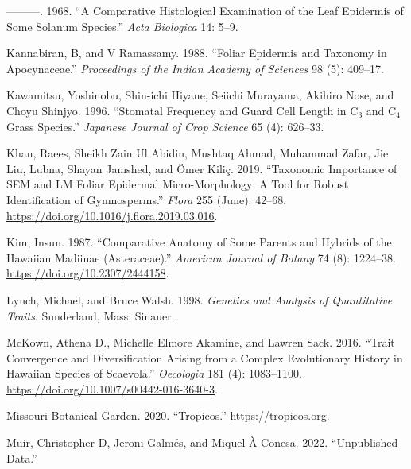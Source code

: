 \documentclass[
  12pt,
]{article}
\newlength{\cslhangindent}
\newlength{\cslentryspacingunit} %
\newenvironment{CSLReferences}[2] %
 {%
  \setlength{\parindent}{0pt}
  \ifodd #1
  \let\oldpar\par
  \def\par{\hangindent=\cslhangindent\oldpar}
  \fi
  \setlength{\parskip}{#2\cslentryspacingunit}
 }%
 {}
\begin{document}
\begin{CSLReferences}{1}{0}
\leavevmode{}%
---------. 1968. {``A Comparative Histological Examination of the Leaf Epidermis of Some {Solanum} Species.''} \emph{Acta Biologica} 14: 5--9.

\leavevmode{}%
Kannabiran, B, and V Ramassamy. 1988. {``Foliar Epidermis and Taxonomy in {Apocynaceae}.''} \emph{Proceedings of the Indian Academy of Sciences} 98 (5): 409--17.

\leavevmode{}%
Kawamitsu, Yoshinobu, Shin-ichi Hiyane, Seiichi Murayama, Akihiro Nose, and Choyu Shinjyo. 1996. {``Stomatal Frequency and Guard Cell Length in {C}\(_{\textrm{3}}\) and {C}\(_{\textrm{4}}\) Grass Species.''} \emph{Japanese Journal of Crop Science} 65 (4): 626--33.

\leavevmode{}%
Khan, Raees, Sheikh Zain Ul Abidin, Mushtaq Ahmad, Muhammad Zafar, Jie Liu, Lubna, Shayan Jamshed, and Ömer Kiliç. 2019. {``Taxonomic Importance of {SEM} and {LM} Foliar Epidermal Micro-Morphology: {A} Tool for Robust Identification of Gymnosperms.''} \emph{Flora} 255 (June): 42--68. \url{https://doi.org/10.1016/j.flora.2019.03.016}.

\leavevmode{}%
Kim, Insun. 1987. {``Comparative {Anatomy} of {Some} {Parents} and {Hybrids} of the {Hawaiian} {Madiinae} ({Asteraceae}).''} \emph{American Journal of Botany} 74 (8): 1224--38. \url{https://doi.org/10.2307/2444158}.

\leavevmode{}%
Lynch, Michael, and Bruce Walsh. 1998. \emph{Genetics and Analysis of Quantitative Traits}. Sunderland, Mass: Sinauer.

\leavevmode{}%
McKown, Athena D., Michelle Elmore Akamine, and Lawren Sack. 2016. {``Trait Convergence and Diversification Arising from a Complex Evolutionary History in {Hawaiian} Species of {Scaevola}.''} \emph{Oecologia} 181 (4): 1083--1100. \url{https://doi.org/10.1007/s00442-016-3640-3}.

\leavevmode{}%
Missouri Botanical Garden. 2020. {``Tropicos.''} \url{https://tropicos.org}.

\leavevmode{}%
Muir, Christopher D, Jeroni Galmés, and Miquel À Conesa. 2022. {``Unpublished Data.''}


\end{CSLReferences}
\end{document}
